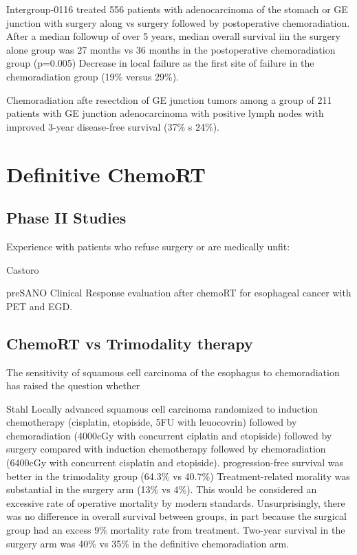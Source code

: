 \documentclass[
]{book}
\begin{document}
Intergroup-0116 \citep{macdonald725} \citep{smalley2327} treated 556 patients with adenocarcinoma of the stomach or GE junction with surgery along vs surgery followed by postoperative chemoradiation. After a median followup of over 5 years, median overall survival iin the surgery alone group was 27 months vs 36 months in the postoperative chemoradiation group (p=0.005) Decrease in local failure as the first site of failure in the chemoradiation group (19\% versus 29\%).

Chemoradiation afte resectdion of GE junction tumors \citep{kofoed26} among a group of 211 patients with GE junction adenocarcinoma with positive lymph nodes with improved 3-year disease-free survival (37\% s 24\%).

\hypertarget{definitive-chemort}{%
\chapter{Definitive ChemoRT}\label{definitive-chemort}}

\hypertarget{phase-ii-studies}{%
\section{Phase II Studies}\label{phase-ii-studies}}

Experience with patients who refuse surgery or are medically unfit:

\citep{taketa300} \citep{taketa95} \citep{furlong107}

Castoro\citep{castoro1375}

preSANO\citep{chirieac1347} Clinical Response evaluation after chemoRT for esophageal cancer with PET and EGD.

\hypertarget{chemort-vs-trimodality-therapy-1}{%
\section{ChemoRT vs Trimodality therapy}\label{chemort-vs-trimodality-therapy-1}}

The sensitivity of squamous cell carcinoma of the esophagus to chemoradiation has raised the question whether

Stahl Locally advanced squamous cell carcinoma randomized to induction chemotherapy (cisplatin, etopiside, 5FU with leuocovrin) followed by chemoradiation (4000cGy with concurrent ciplatin and etopiside) followed by surgery compared with induction chemotherapy followed by chemoradiation (6400cGy with concurrent cisplatin and etopiside).\citep{stahl2310} progression-free survival was better in the trimodality group (64.3\% vs 40.7\%) Treatment-related morality was substantial in the surgery arm (13\% vs 4\%). This would be considered an excessive rate of operative mortality by modern standards. Unsurprisingly, there was no difference in overall survival between groups, in part because the surgical group had an excess 9\% mortality rate from treatment. Two-year survival in the surgery arm was 40\% vs 35\% in the definitive chemoradiation arm. \citep{stahl4530}
\end{document}
